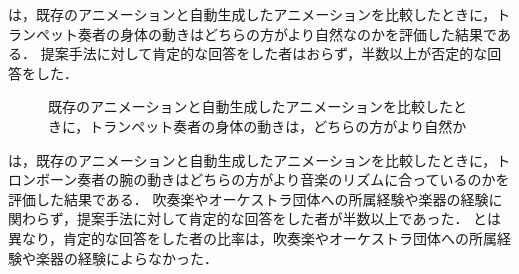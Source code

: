 \vspace{5mm}
\par
{}は，既存のアニメーションと自動生成したアニメーションを比較したときに，トランペット奏者の身体の動きはどちらの方がより自然なのかを評価した結果である．
提案手法に対して肯定的な回答をした者はおらず，半数以上が否定的な回答をした．
\begin{figure}[!h]
	\centering
	\caption{既存のアニメーションと自動生成したアニメーションを比較したときに，トランペット奏者の身体の動きは，どちらの方がより自然か}
	\label{fig:Q2-2}
\end{figure}
\newpage
\par
{}は，既存のアニメーションと自動生成したアニメーションを比較したときに，トロンボーン奏者の腕の動きはどちらの方がより音楽のリズムに合っているのかを評価した結果である．
吹奏楽やオーケストラ団体への所属経験や楽器の経験に関わらず，提案手法に対して肯定的な回答をした者が半数以上であった．
とは異なり，肯定的な回答をした者の比率は，吹奏楽やオーケストラ団体への所属経験や楽器の経験によらなかった．
